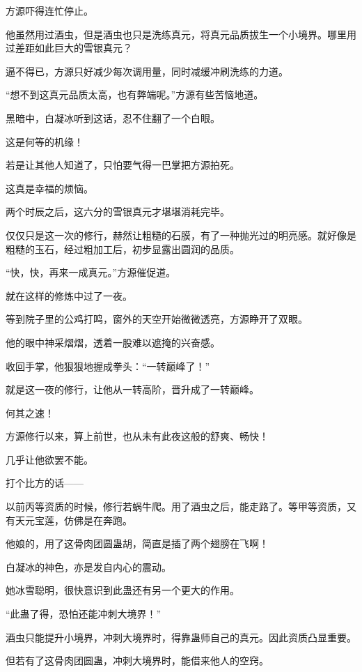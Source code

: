 
\begin{this_body}

方源吓得连忙停止。

他虽然用过酒虫，但是酒虫也只是洗练真元，将真元品质拔生一个小境界。哪里用过差距如此巨大的雪银真元？

逼不得已，方源只好减少每次调用量，同时减缓冲刷洗练的力道。

“想不到这真元品质太高，也有弊端呢。”方源有些苦恼地道。

黑暗中，白凝冰听到这话，忍不住翻了一个白眼。

这是何等的机缘！

若是让其他人知道了，只怕要气得一巴掌把方源拍死。

这真是幸福的烦恼。

两个时辰之后，这六分的雪银真元才堪堪消耗完毕。

仅仅只是这一次的修行，赫然让粗糙的石膜，有了一种抛光过的明亮感。就好像是粗糙的玉石，经过粗加工后，初步显露出圆润的品质。

“快，快，再来一成真元。”方源催促道。

就在这样的修炼中过了一夜。

等到院子里的公鸡打鸣，窗外的天空开始微微透亮，方源睁开了双眼。

他的眼中神采熠熠，透着一股难以遮掩的兴奋感。

收回手掌，他狠狠地握成拳头：“一转巅峰了！”

就是这一夜的修行，让他从一转高阶，晋升成了一转巅峰。

何其之速！

方源修行以来，算上前世，也从未有此夜这般的舒爽、畅快！

几乎让他欲罢不能。

打个比方的话——

以前丙等资质的时候，修行若蜗牛爬。用了酒虫之后，能走路了。等甲等资质，又有天元宝莲，仿佛是在奔跑。

他娘的，用了这骨肉团圆蛊胡，简直是插了两个翅膀在飞啊！

白凝冰的神色，亦是发自内心的震动。

她冰雪聪明，很快意识到此蛊还有另一个更大的作用。

“此蛊了得，恐怕还能冲刺大境界！”

酒虫只能提升小境界，冲刺大境界时，得靠蛊师自己的真元。因此资质凸显重要。

但若有了这骨肉团圆蛊，冲刺大境界时，能借来他人的空窍。


\end{this_body}
